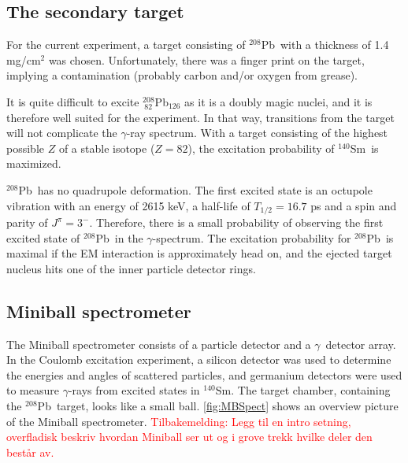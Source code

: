 \documentclass[twoside,english]{uiofysmaster/uiofysmaster}
\newcommand{\Sm}{$^{140}$Sm} %
\newcommand{\Pb}{$^{208}$Pb}
\newcommand{\ga}{$\gamma$}
\let\orgautoref\autoref
\renewcommand{\autoref}
        {%
		 \def\sectionautorefname{Section}%
		 \def\subsectionautorefname{Section}%
		 \def\subsubsectionautorefname{Section}%
		 \def\chapterautorefname{Chapter}%
          \orgautoref}
\begin{document}

\subsection{The secondary target}\label{ssec:Pb}
For the current experiment, a target consisting of \Pb\ with a thickness of 1.4 mg/cm$^2$ was chosen. 
Unfortunately, there was a finger print on the target, implying a contamination (probably carbon and/or oxygen from grease).

It is quite difficult to excite $^{208}_{~82}$Pb$_{126}$ as it is a doubly magic nuclei, and it is therefore well suited for the experiment. 
In that way, transitions from the target will not complicate the \ga-ray spectrum.
With a target consisting of the highest possible $Z$ of a stable isotope ($Z = 82$), the excitation probability of \Sm\ is maximized. 

\Pb\ has no quadrupole deformation.
The first excited state is an octupole vibration with an energy of 2615 keV, a half-life of $T_{1/2} = 16.7$ ps and a spin and parity of $J^\pi = 3^-$.
Therefore, there is a small probability of observing the first excited state of \Pb\ in the \ga-spectrum. 
The excitation probability for \Pb\ is maximal if the EM interaction is approximately head on, and the ejected target nucleus hits one of the inner particle detector rings.


\subsection{Miniball spectrometer}
The Miniball spectrometer consists of a particle detector and a \ga\ detector array.
In the Coulomb excitation experiment, a silicon detector was used to determine the energies and angles of scattered particles, and germanium detectors were used to measure \ga-rays from excited states in \Sm.
The target chamber, containing the \Pb\ target, looks like a small ball.
\autoref{fig:MBSpect} shows an overview picture of the Miniball spectrometer. 
\textcolor{red}{Tilbakemelding: Legg til en intro setning, overfladisk beskriv hvordan Miniball ser ut og i grove trekk hvilke deler den består av.}
\end{document}

